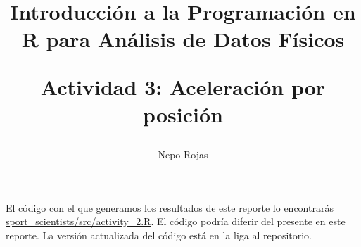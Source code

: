 

\author{Nepo Rojas}

\title{Introducción a la Programación en R para Análisis de Datos Físicos \\ \begin{large}
    Actividad 3: Aceleración por posición \end{large}}



\maketitle

El código con el que generamos los resultados de este reporte lo encontrarás
\href{https://github.com/niesfutbol/sport_scientists/blob/develop/src/activity_3.R}{sport\_scientists/src/activity\_2.R}.
El código podría diferir del presente en este reporte. La versión actualizada del código está en la
liga al repositorio.


